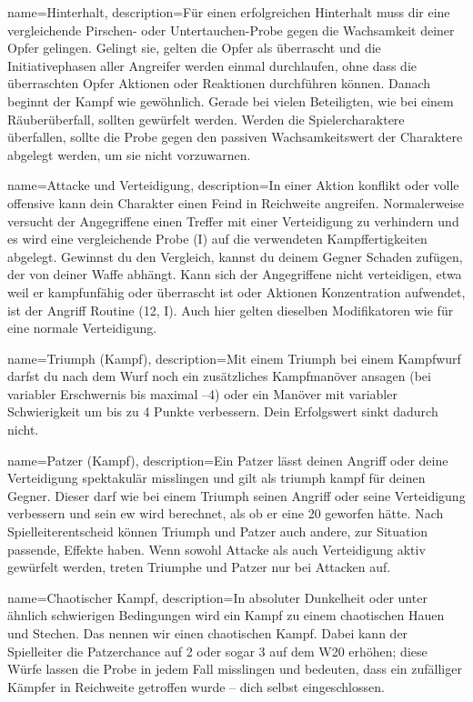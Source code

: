 {
    name={Hinterhalt},
description={Für einen erfolgreichen Hinterhalt muss dir eine vergleichende Pirschen- oder Untertauchen-Probe gegen die Wachsamkeit deiner Opfer gelingen. Gelingt sie, gelten die Opfer als überrascht und die Initiativephasen aller Angreifer werden einmal durchlaufen, ohne dass die überraschten Opfer Aktionen oder Reaktionen durchführen können. Danach beginnt der Kampf wie gewöhnlich. Gerade bei vielen Beteiligten, wie bei einem Räuberüberfall, sollten  gewürfelt werden. Werden die Spielercharaktere überfallen, sollte die Probe gegen den passiven Wachsamkeitswert der Charaktere abgelegt werden, um sie nicht vorzuwarnen.}}

{
    name={Attacke und Verteidigung},
    description={In einer Aktion \gls{konflikt} oder \gls{volle offensive} kann dein Charakter einen Feind in Reichweite angreifen. Normalerweise versucht der Angegriffene einen Treffer mit einer Verteidigung zu verhindern und es wird eine vergleichende Probe (I) auf die verwendeten Kampffertigkeiten abgelegt. Gewinnst du den Vergleich, kannst du deinem Gegner Schaden zufügen, der von deiner Waffe abhängt. Kann sich der Angegriffene nicht verteidigen, etwa weil er kampfunfähig oder überrascht ist oder Aktionen Konzentration aufwendet, ist der Angriff Routine (12, I). Auch hier gelten dieselben Modifikatoren wie für eine normale Verteidigung.}}

{
    name={Triumph (Kampf)},
    description={Mit einem Triumph bei einem Kampfwurf darfst du nach dem Wurf noch ein zusätzliches Kampfmanöver ansagen (bei variabler Erschwernis bis maximal –4) oder ein Manöver mit variabler Schwierigkeit um bis zu 4 Punkte verbessern. Dein Erfolgswert sinkt dadurch nicht.}}

{
    name={Patzer (Kampf)},
    description={Ein Patzer lässt deinen Angriff oder deine Verteidigung spektakulär misslingen und gilt als \gls{triumph kampf} für deinen Gegner. Dieser darf wie bei einem Triumph seinen Angriff oder seine Verteidigung verbessern und sein \gls{ew} wird berechnet, als ob er eine 20 geworfen hätte. Nach Spielleiterentscheid können Triumph und Patzer auch andere, zur Situation passende, Effekte haben. Wenn sowohl Attacke als auch Verteidigung aktiv gewürfelt werden, treten Triumphe und Patzer nur bei Attacken auf.}}

{
    name={Chaotischer Kampf},
    description={In absoluter Dunkelheit oder unter ähnlich schwierigen Bedingungen wird ein Kampf zu einem chaotischen Hauen und Stechen. Das nennen wir einen chaotischen Kampf. Dabei kann der Spielleiter die Patzerchance auf 2 oder sogar 3 auf dem W20 erhöhen; diese Würfe lassen die Probe in jedem Fall misslingen und bedeuten, dass ein zufälliger Kämpfer in Reichweite getroffen wurde – dich selbst eingeschlossen.}}

